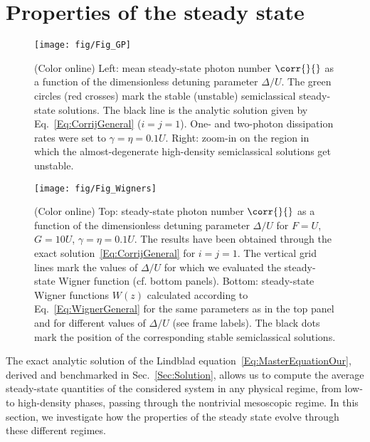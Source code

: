 \section{Properties of the steady state}\label{Sec:Study}

\begin{figure}[t]
	\texttt{[image: fig/Fig\_GP]}
	\caption{(Color online)
		Left: mean steady-state photon number $\corr{}{}$ as a function of the dimensionless detuning parameter $\Delta/U$.
		The green circles (red crosses) mark the stable (unstable) semiclassical steady-state solutions.
		The black line is the analytic solution given by Eq.~\eqref{Eq:CorrijGeneral} ($i=j=1$).
		One- and two-photon dissipation rates were set to $\gamma=\eta=0.1U$.
		Right: zoom-in on the region in which the almost-degenerate high-density semiclassical solutions get unstable.}
	\label{Fig:GP}
\end{figure}

\begin{figure*}[t]
	\texttt{[image: fig/Fig\_Wigners]}
	\caption{(Color online)
		Top: steady-state photon number $\corr{}{}$ as a function of the dimensionless detuning parameter $\Delta/U$ for $F=U$, $G=10U$, $\gamma=\eta=0.1U$.
		The results have been obtained through the exact solution~\eqref{Eq:CorrijGeneral} for $i=j=1$.
		The vertical grid lines mark the values of $\Delta/U$ for which we evaluated the steady-state Wigner function (cf. bottom panels).
		Bottom: steady-state Wigner functions $W(z)$ calculated according to Eq.~\eqref{Eq:WignerGeneral} for the same parameters as in the top panel and for different values of $\Delta/U$ (see frame labels).
		The black dots mark the position of the corresponding stable semiclassical solutions.}
	\label{Fig:Wigners}
\end{figure*}

The exact analytic solution of the Lindblad equation~\eqref{Eq:MasterEquationOur}, derived and benchmarked in Sec.~\ref{Sec:Solution}, allows us to compute the average steady-state quantities of the considered system in any physical regime, from low- to high-density phases, passing through the nontrivial mesoscopic regime.
In this section, we investigate how the properties of the steady state evolve through these different regimes.

